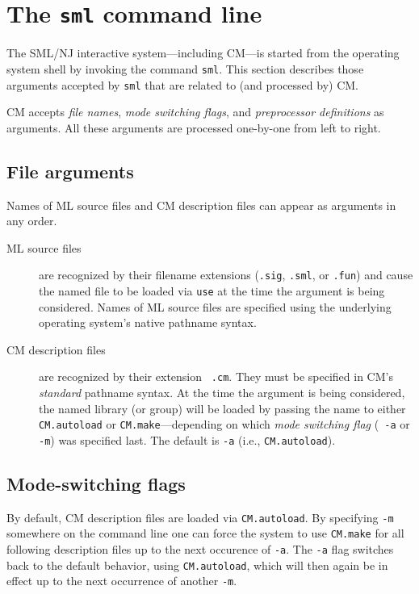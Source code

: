 
\section{The {\tt sml} command line}

The SML/NJ interactive system---including CM---is started from the
operating system shell by invoking the command {\tt sml}.
This section describes those arguments accepted by {\tt sml} that
are related to (and processed by) CM.

CM accepts {\em file names}, {\em mode switching flags}, and {\em
preprocessor definitions} as arguments.  All these arguments are
processed one-by-one from left to right.

\subsection{File arguments}

Names of ML source files and CM description files can appear as
arguments in any order.

\begin{description}
\item[ML source files] are recognized by their filename extensions
({\tt .sig}, {\tt .sml}, or {\tt .fun}) and cause the named file to be
loaded via {\tt use} at the time the argument is being considered.
Names of ML source files are specified using the underlying operating
system's native pathname syntax.
\item[CM description files] are recognized by their extension {\tt
.cm}.  They must be specified in CM's {\em standard} pathname syntax.
At the time the argument is being considered, the named library (or
group) will be loaded by passing the name to either {\tt CM.autoload}
or {\tt CM.make}---depending on which {\em mode switching flag} ({\tt
-a} or {\tt -m}) was specified last.  The default is {\tt -a} (i.e.,
{\tt CM.autoload}).
\end{description}

\subsection{Mode-switching flags}

By default, CM description files are loaded via {\tt CM.autoload}.  By
specifying {\tt -m} somewhere on the command line one can force the
system to use {\tt CM.make} for all following description files up to
the next occurence of {\tt -a}.  The {\tt -a} flag switches back to
the default behavior, using {\tt CM.autoload}, which will then again
be in effect up to the next occurrence of another {\tt -m}.

